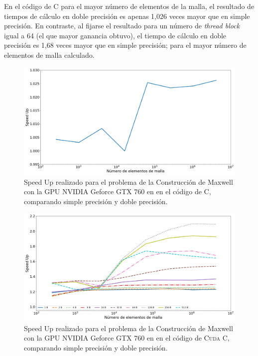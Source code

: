 En el código de \textsc{C} para el mayor número de elementos de la malla, el resultado de tiempos de cálculo en doble precisión es apenas 1,026 veces mayor que en  simple precisión. En contraste, al fijarse el resultado para un número de \textit{thread block} igual a 64 (el que mayor ganancia obtuvo), el tiempo de cálculo en doble precisión es 1,68 veces mayor que en simple precisión; para el mayor número de elementos de malla calculado.

\begin{figure}[htbp]
	\centering
	\includegraphics[width=\textwidth]{figs/cap4/c_760_MxC_c_10}
	\caption{Speed Up realizado para el problema de la Construcción de Maxwell con la GPU NVIDIA Geforce GTX 760 en en el código de \textsc{C}, comparando simple precisión y doble precisión.} 
	\label{fig:c_760_MxC_c_10}	
\end{figure}

\begin{figure}[htbp]
	\centering
	\includegraphics[width=\textwidth]{figs/cap4/c_760_MxC_cuda_10}
	\caption{Speed Up realizado para el problema de la Construcción de Maxwell con la GPU NVIDIA Geforce GTX 760 en en el código de \textsc{Cuda C}, comparando simple precisión y doble precisión.} 
	\label{fig:c_760_MxC_cuda_10}	
\end{figure}

